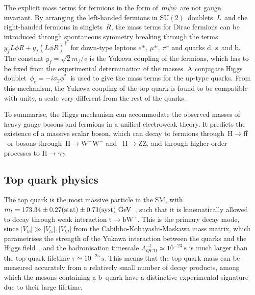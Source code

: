 The explicit mass terms for fermions in the form of~$m \bar{\psi} \psi$~are not gauge invariant. By arranging the left-handed fermions in $\mathrm{SU}(2)$~doublets~$L$~and the right-handed fermions in singlets~$R$, the mass terms for Dirac fermions can be introduced through spontaneous symmetry breaking through the terms~$y_f \bar{L}\phi R + y_f (\bar{L}\phi R)^\dagger$~for down-type leptons $e^\pm$, $\mu^\pm$, $\tau^\pm$ and quarks $\mathrm{d}$, $\mathrm{s}$~and $\mathrm{b}$. The constant $y_f = \sqrt{2} m_f / v$ is the Yukawa coupling of the fermions, which has to be fixed from the experimental determination of the masses. A conjugate Higgs doublet~$\phi_c = -i\sigma_2 \phi^*$~is used to give the mass terms for the up-type quarks. From this mechanism, the Yukawa coupling of the top quark is found to be compatible with unity, a scale very different from the rest of the quarks.

To summarise, the Higgs mechanism can accommodate the observed masses of heavy gauge bosons and fermions in a unified electroweak theory. It predicts the existence of a massive scalar boson, which can decay to fermions through~$\mathrm{H} \rightarrow \mathrm{f} \bar{\mathrm{f}}$~or bosons through~$\mathrm{H} \rightarrow \mathrm{W}^+ \mathrm{W}^-$ and ~$\mathrm{H} \rightarrow \mathrm{Z} \mathrm{Z}$, and through higher-order processes to $\mathrm{H} \rightarrow \gamma \gamma$.

\subsection{Top quark physics}
The top quark is the most massive particle in the SM, with $m_t = 173.34 \pm \allowbreak 0.27 \mathrm{(stat)} \pm \allowbreak 0.71 \mathrm{(syst)} ~\mathrm{GeV}$~\cite{ATLAS:2014wva}, such that it is kinematically allowed to decay through weak interaction $\mathrm{t} \rightarrow \mathrm{b} \mathrm{W}^+$. This is the primary decay mode, since $|V_{tb}| \gg |V_{ts}|, |V_{td}|$ from the Cabibbo-Kobayashi-Maskawa mass matrix, which parametrises the strength of the Yukawa interaction between the quarks and the Higgs field~\cite{Cabibbo:1963yz,Kobayashi:1973fv}, and the hadronisation timescale $\Lambda_{QCD}^{-1} \simeq 10^{-23}~\mathrm{s}$ is much larger than the top quark lifetime $\tau \simeq 10^{-25}~\mathrm{s}$. This means that the top quark mass can be measured accurately from a relatively small number of decay products, among which the mesons containing a b~quark have a distinctive experimental signature due to their large lifetime.

